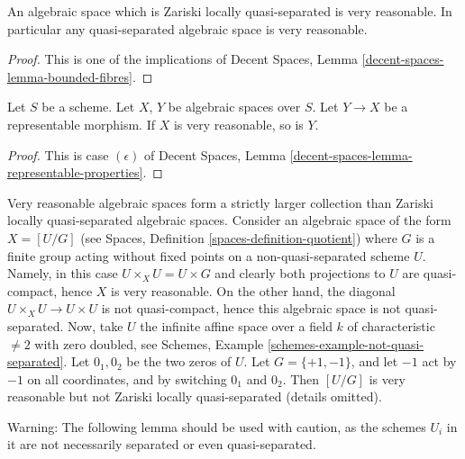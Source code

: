 \begin{lemma}
\label{lemma-quasi-separated-very-reasonable}
An algebraic space which is Zariski locally quasi-separated is very reasonable.
In particular any quasi-separated algebraic space is very reasonable.
\end{lemma}

\begin{proof}
This is one of the implications of
Decent Spaces, Lemma \ref{decent-spaces-lemma-bounded-fibres}.
\end{proof}

\begin{lemma}
\label{lemma-representable-very-reasonable}
Let $S$ be a scheme.
Let $X$, $Y$ be algebraic spaces over $S$.
Let $Y \to X$ be a representable morphism.
If $X$ is very reasonable, so is $Y$.
\end{lemma}

\begin{proof}
This is case $(\epsilon)$ of
Decent Spaces, Lemma \ref{decent-spaces-lemma-representable-properties}.
\end{proof}

\begin{remark}
\label{remark-very-reasonable-Zariski-locally-quasi-separated}
Very reasonable algebraic spaces form a strictly larger collection than
Zariski locally quasi-separated algebraic spaces. Consider
an algebraic space of the form $X = [U/G]$ (see
Spaces, Definition \ref{spaces-definition-quotient})
where $G$ is a finite group acting without fixed points on a
non-quasi-separated scheme $U$. Namely, in this case
$U \times_X U = U \times G$ and clearly both projections to $U$ are
quasi-compact, hence $X$ is very reasonable. On the other hand, the diagonal
$U \times_X U \to U \times U$ is not quasi-compact, hence this
algebraic space is not quasi-separated. Now, take $U$ the infinite
affine space over a field $k$ of characteristic $\not = 2$ with
zero doubled, see
Schemes, Example \ref{schemes-example-not-quasi-separated}.
Let $0_1, 0_2$ be the two zeros of $U$. Let $G = \{+1, -1\}$, and
let $-1$ act by $-1$ on all coordinates, and by switching
$0_1$ and $0_2$. Then $[U/G]$ is very reasonable but not Zariski locally
quasi-separated (details omitted).
\end{remark}

\noindent
Warning: The following lemma should be used with caution, as the schemes
$U_i$ in it are not necessarily separated or even quasi-separated.

